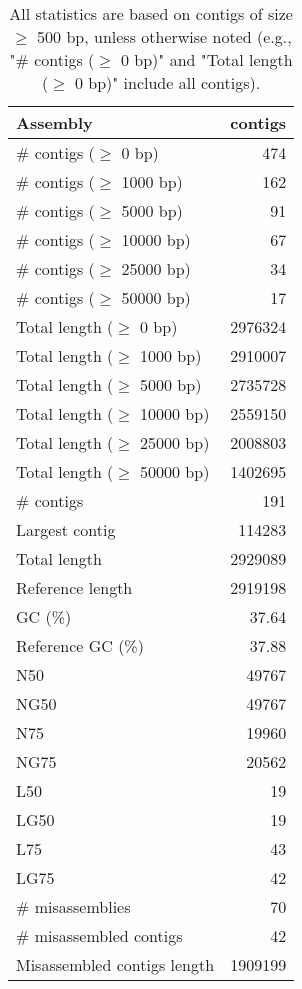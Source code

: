 \documentclass[12pt,a4paper]{article}
\begin{document}
\begin{table}[ht]
\begin{center}
\caption{All statistics are based on contigs of size $\geq$ 500 bp, unless otherwise noted (e.g., "\# contigs ($\geq$ 0 bp)" and "Total length ($\geq$ 0 bp)" include all contigs).}
\begin{tabular}{|l*{1}{|r}|}
\hline
Assembly & contigs \\ \hline
\# contigs ($\geq$ 0 bp) & 474 \\ \hline
\# contigs ($\geq$ 1000 bp) & 162 \\ \hline
\# contigs ($\geq$ 5000 bp) & 91 \\ \hline
\# contigs ($\geq$ 10000 bp) & 67 \\ \hline
\# contigs ($\geq$ 25000 bp) & 34 \\ \hline
\# contigs ($\geq$ 50000 bp) & 17 \\ \hline
Total length ($\geq$ 0 bp) & 2976324 \\ \hline
Total length ($\geq$ 1000 bp) & 2910007 \\ \hline
Total length ($\geq$ 5000 bp) & 2735728 \\ \hline
Total length ($\geq$ 10000 bp) & 2559150 \\ \hline
Total length ($\geq$ 25000 bp) & 2008803 \\ \hline
Total length ($\geq$ 50000 bp) & 1402695 \\ \hline
\# contigs & 191 \\ \hline
Largest contig & 114283 \\ \hline
Total length & 2929089 \\ \hline
Reference length & 2919198 \\ \hline
GC (\%) & 37.64 \\ \hline
Reference GC (\%) & 37.88 \\ \hline
N50 & 49767 \\ \hline
NG50 & 49767 \\ \hline
N75 & 19960 \\ \hline
NG75 & 20562 \\ \hline
L50 & 19 \\ \hline
LG50 & 19 \\ \hline
L75 & 43 \\ \hline
LG75 & 42 \\ \hline
\# misassemblies & 70 \\ \hline
\# misassembled contigs & 42 \\ \hline
Misassembled contigs length & 1909199 \\ \hline

\end{tabular}
\end{center}
\end{table}
\end{document}
